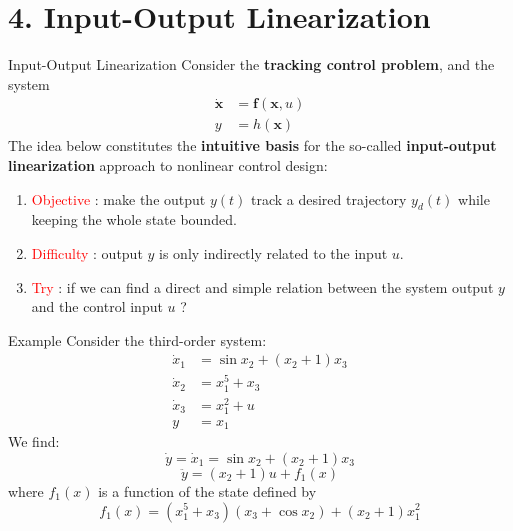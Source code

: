 \documentclass{beamer}
\renewcommand{\vec}[1]{\ensuremath{\boldsymbol{#1}}} %
\begin{document}
\section{4. Input-Output Linearization}


\begin{frame}{Input-Output Linearization}
Consider the \textbf{tracking control problem}, and the system
    \begin{equation}\label{tracking-control}
      \begin{aligned}
        \dot{\vec{x}} &= \vec{f}(\vec{x}, u) \\
        y &= h(\vec{x})
      \end{aligned}
    \end{equation}
The idea below constitutes the \textbf{intuitive basis} for the so-called \textbf{input-output linearization} approach to nonlinear control design:
    \begin{enumerate}
      \item \textcolor{red}{Objective} : make the output $y(t)$ track a desired trajectory $y_{d}(t)$ while keeping the whole state bounded.
      \item \textcolor{red}{Difficulty} : output $y$ is only indirectly related to the input $u$.
      \item \textcolor{red}{Try} : if we can find a direct and simple relation between the system output $y$ and the control input $u$ ?
    \end{enumerate}
\end{frame}


\begin{frame}{Example}
Consider the third-order system:
    \begin{equation}\label{third-order}
      \begin{aligned}
        \dot{x}_{1} &= \sin x_{2}+(x_{2}+1)x_{3} \\
        \dot{x}_{2} &= x_{1}^{5}+x_{3} \\
        \dot{x}_{3} &= x_{1}^{2}+u \\
        y &= x_{1}
      \end{aligned}
    \end{equation}
We find:
    $$
    \dot{y}=\dot{x}_{1}=\sin x_{2}+\left(x_{2}+1\right) x_{3}
    $$
    \begin{equation}\label{double}
      \ddot{y}=\left(x_{2}+1\right) u+f_{1}(x)
    \end{equation}
where $f_{1}(x)$ is a function of the state defined by
    \begin{equation}\label{f1x}
        f_{1}(x)=\left(x_{1}^{5}+x_{3}\right)\left(x_{3}+\cos x_{2}\right)+\left(x_{2}+1\right) x_{1}^{2}
    \end{equation}
\end{frame}
\end{document}
